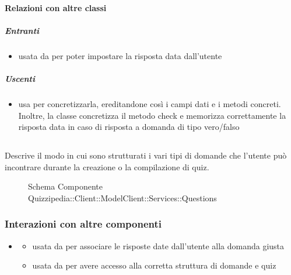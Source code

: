 \paragraph{Relazioni con altre classi}
\subparagraph{Entranti}
\begin{itemize}
\item usata da  per poter impostare la risposta data dall'utente
\end{itemize}
\subparagraph{Uscenti}
\begin{itemize}
\item usa  per concretizzarla, ereditandone così i campi dati e i metodi concreti. Inoltre, la classe concretizza il metodo check e memorizza correttamente la risposta data in caso di risposta a domanda di tipo vero/falso
\end{itemize}
\subsection{}
Descrive il modo in cui sono strutturati i vari tipi di domande che l'utente può incontrare durante la creazione o la compilazione di quiz.
\begin{figure}[H]
\centering
\noindent{}
\caption[Schema Componente Quizzipedia::Client::ModelClient::Services::Questions]{Schema Componente Quizzipedia::Client::ModelClient::Services::Questions}
\end{figure}
\subsubsection{Interazioni con altre componenti}
\begin{itemize}
\item {}
\begin{itemize}
\item usata da  per associare le risposte date dall'utente alla domanda giusta
\item usata da  per avere accesso alla corretta struttura di domande e quiz
\end{itemize}
\end{itemize}

